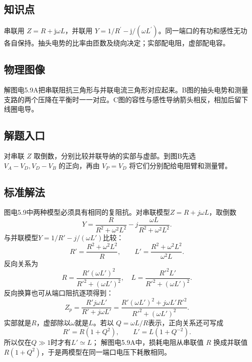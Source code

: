 \documentclass[UTF8,fontset=fandol,a4paper,11pt]{ctexart}
\begin{document}


\subsection*{知识点}

串联用 $Z=R+\mathrm j\omega L$，并联用 $Y=1/R^{\prime}-\mathrm j/(\omega L^{\prime})$。同一端口的有功和感性无功各自保持。抽头电势的比率由匝数及绕向决定；实部配电阻，虚部配电容。



\subsection*{物理图像}

解图电5.9A把串联阻抗三角形与并联电流三角形对应起来。B图的抽头电势和测量支路的两个压降在平衡时一一对应。C图的容性与感性导纳箭头相反，相加后留下线圈电导。



\subsection*{解题入口}

对串联 $Z$ 取倒数，分别比较并联导纳的实部与虚部。到图B先选 $V_A-V_D,V_D-V_B$ 的正向，再由 $V_P=V_D$ 将它们分别配给电阻臂和测量臂。


\subsection*{标准解法}


图电5.9中两种模型必须具有相同的复阻抗。对串联模型$Z=R+j\omega L$，取倒数
\[
 Y=\frac{R}{R^2+\omega^2L^2}
 -j\frac{\omega L}{R^2+\omega^2L^2}.
\]
与并联模型$Y=1/R'-j/(\omega L')$比较：
\[
 \boxed{R'=\frac{R^2+\omega^2L^2}{R},\qquad
 L'=\frac{R^2+\omega^2L^2}{\omega^2L}.}
\]
反向关系为
\[
 \boxed{R=\frac{R'(\omega L')^2}{R'^2+(\omega L')^2},\quad
 L=\frac{R'^2L'}{R'^2+(\omega L')^2}.}
\]
反向换算也可从端口阻抗逐项得到：
\[
Z_p=\frac{R'j\omega L'}{R'+j\omega L'}
=\frac{R'(\omega L')^2+j\omega L'R'^2}
{R'^2+(\omega L')^2}.
\]
实部就是$R$，虚部除以$\omega$就是$L$。若以
$Q=\omega L/R$表示，正向关系还可写成
\[
R'=R(1+Q^2),\qquad L'=L(1+Q^{-2}).
\]
所以仅在$Q\gg1$时才有$L'\simeq L$；
解图电5.9A中，损耗电阻从串联值 $R$ 换成并联值 $R(1+Q^2)$，于是两模型在同一端口电压下耗散相同。
\end{document}
